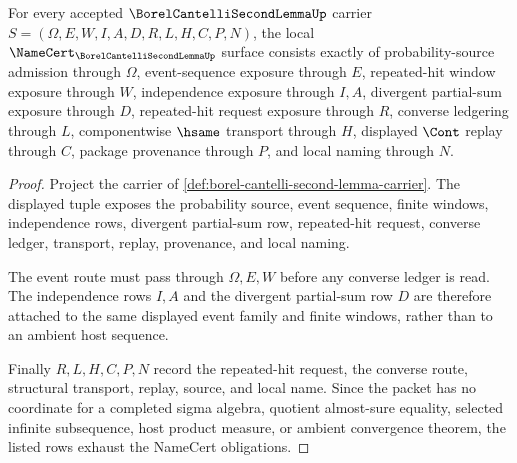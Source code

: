 \begin{theorem}
\label{thm:borel-cantelli-second-lemma-namecert-obligations}
For every accepted $\BorelCantelliSecondLemmaUp$ carrier $S=(\Omega,E,W,I,A,D,R,L,H,C,P,N)$, the local $\NameCert_{\BorelCantelliSecondLemmaUp}$ surface consists exactly of probability-source admission through $\Omega$, event-sequence exposure through $E$, repeated-hit window exposure through $W$, independence exposure through $I,A$, divergent partial-sum exposure through $D$, repeated-hit request exposure through $R$, converse ledgering through $L$, componentwise $\hsame$ transport through $H$, displayed $\Cont$ replay through $C$, package provenance through $P$, and local naming through $N$.
\end{theorem}
\begin{proof}
Project the carrier of \autoref{def:borel-cantelli-second-lemma-carrier}. The displayed tuple exposes the probability source, event sequence, finite windows, independence rows, divergent partial-sum row, repeated-hit request, converse ledger, transport, replay, provenance, and local naming.

The event route must pass through $\Omega,E,W$ before any converse ledger is read. The independence rows $I,A$ and the divergent partial-sum row $D$ are therefore attached to the same displayed event family and finite windows, rather than to an ambient host sequence.

Finally $R,L,H,C,P,N$ record the repeated-hit request, the converse route, structural transport, replay, source, and local name. Since the packet has no coordinate for a completed sigma algebra, quotient almost-sure equality, selected infinite subsequence, host product measure, or ambient convergence theorem, the listed rows exhaust the NameCert obligations.
\end{proof}

